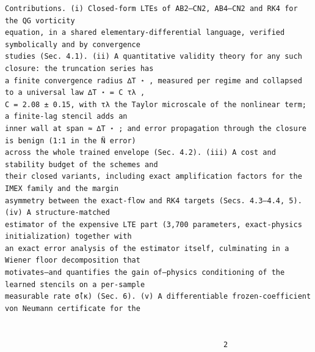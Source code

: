 \documentclass[letterpaper]{article}
\begin{document}
\begin{Verbatim}[fontsize=\fontsize{6.35}{7.15}\selectfont,breaklines=false]
Contributions. (i) Closed-form LTEs of AB2–CN2, AB4–CN2 and RK4 for the QG vorticity
equation, in a shared elementary-differential language, verified symbolically and by convergence
studies (Sec. 4.1). (ii) A quantitative validity theory for any such closure: the truncation series has
a finite convergence radius ∆T ⋆ , measured per regime and collapsed to a universal law ∆T ⋆ = C τλ ,
C = 2.08 ± 0.15, with τλ the Taylor microscale of the nonlinear term; a finite-lag stencil adds an
inner wall at span ≈ ∆T ⋆ ; and error propagation through the closure is benign (1:1 in the N̈ error)
across the whole trained envelope (Sec. 4.2). (iii) A cost and stability budget of the schemes and
their closed variants, including exact amplification factors for the IMEX family and the margin
asymmetry between the exact-flow and RK4 targets (Secs. 4.3–4.4, 5). (iv) A structure-matched
estimator of the expensive LTE part (3,700 parameters, exact-physics initialization) together with
an exact error analysis of the estimator itself, culminating in a Wiener floor decomposition that
motivates—and quantifies the gain of—physics conditioning of the learned stencils on a per-sample
measurable rate σ̂(κ) (Sec. 6). (v) A differentiable frozen-coefficient von Neumann certificate for the


                                                  2
\end{Verbatim}
\newpage
\end{document}
